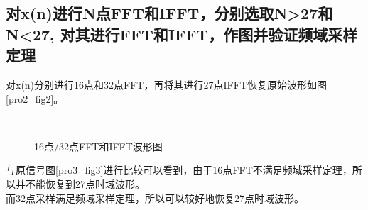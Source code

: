 \documentclass[UTF8]{article}
\begin{document}
\begin{CJK}{UTF8}{gkai}
\subsection{对x(n)进行N点FFT和IFFT，分别选取N>27和N<27, 对其进行FFT和IFFT，作图并验证频域采样定理}
对x(n)分别进行16点和32点FFT，再将其进行27点IFFT恢复原始波形如图\ref{pro2_fig2}。
\begin{figure}[H]
  \centering
  \\
  \caption{16点/32点FFT和IFFT波形图}
  \label{pro3_fig23}
\end{figure}



与原信号图\ref{pro3_fig3}进行比较可以看到，由于16点FFT不满足频域采样定理，所以并不能恢复到27点时域波形。\\
而32点采样满足频域采样定理，所以可以较好地恢复27点时域波形。

\end{CJK}
\end{document}
